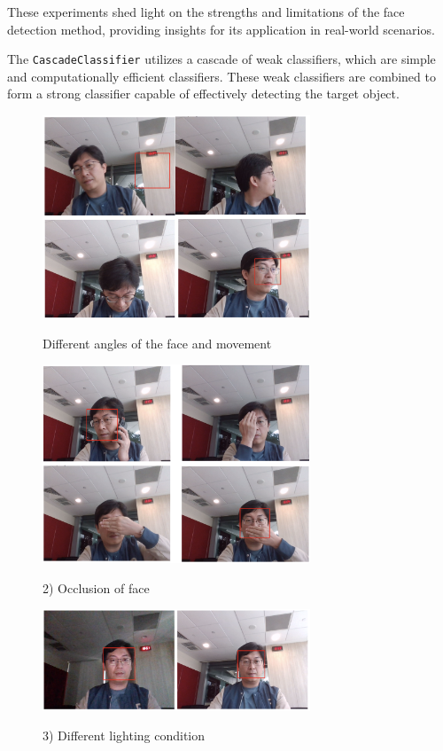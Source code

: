 \documentclass{article}
\begin{document}
These experiments shed light on the strengths and limitations of the face detection method, providing insights for its application in real-world scenarios.

The \texttt{CascadeClassifier} utilizes a cascade of weak classifiers, which are simple and computationally efficient classifiers. These weak classifiers are combined to form a strong classifier capable of effectively detecting the target object.

\begin{figure}[tbh]
    \begin{center}
        \includegraphics[width=8cm]{face-detection-test-one.png}\
        \caption{Different angles of the face and movement\label{figure2}} 
    \end{center}
\end{figure}

\begin{figure}[tbh]
    \begin{center}
        \includegraphics[width=8cm]{face-detection-test-two.png}\
        \caption{2)	Occlusion of face\label{figure2}} 
    \end{center}
\end{figure}

\begin{figure}[tbh]
    \begin{center}
        \includegraphics[width=8cm]{face-detection-test-three.png}\
        \caption{3)	Different lighting condition\label{figure2}} 
    \end{center}
\end{figure}
\end{document}
